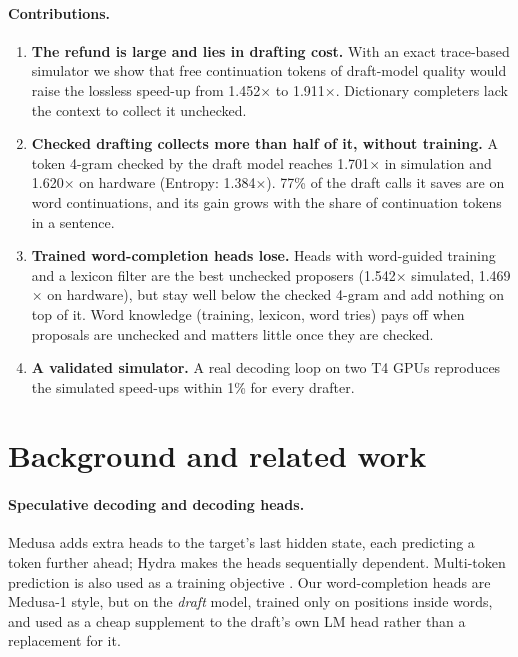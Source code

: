 \documentclass[11pt]{article}
\newcommand{\x}{$\times$}
\begin{document}
\paragraph{Contributions.}
\begin{enumerate}
  \item \textbf{The refund is large and lies in drafting cost.} With an exact trace-based simulator
  we show that free continuation tokens of draft-model quality would raise the lossless speed-up from
  1.452\x{} to 1.911\x{}. Dictionary completers lack the context to collect it unchecked.
  \item \textbf{Checked drafting collects more than half of it, without training.} A token 4-gram
  checked by the draft model reaches 1.701\x{} in simulation and 1.620\x{} on hardware (Entropy:
  1.384\x). 77\% of the draft calls it saves are on word continuations, and its gain grows with the
  share of continuation tokens in a sentence.
  \item \textbf{Trained word-completion heads lose.} Heads with word-guided training and a lexicon
  filter are the best unchecked proposers (1.542\x{} simulated, 1.469\x{} on hardware), but stay well
  below the checked 4-gram and add nothing on top of it. Word knowledge (training, lexicon, word tries)
  pays off when proposals are unchecked and matters little once they are checked.
  \item \textbf{A validated simulator.} A real decoding loop on two T4 GPUs reproduces the simulated
  speed-ups within 1\% for every drafter.
\end{enumerate}

\section{Background and related work}
\label{sec:related}

\paragraph{Speculative decoding and decoding heads.}
Medusa \citep{cai2024medusa} adds extra heads to the target's last hidden state, each predicting a
token further ahead; Hydra \citep{ankner2024hydra} makes the heads sequentially dependent.
Multi-token prediction is also used as a training objective \citep{gloeckle2024better}. Our
word-completion heads are Medusa-1 style, but on the \emph{draft} model, trained only on positions
inside words, and used as a cheap supplement to the draft's own LM head rather than a replacement for it.
\end{document}
